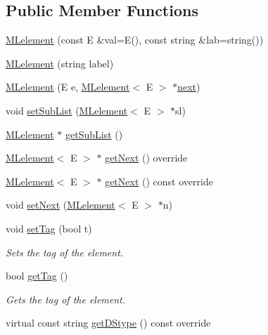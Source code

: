 \subsection*{Public Member Functions}
\begin{DoxyCompactItemize}
\item 
\hyperlink{classbridges_1_1datastructure_1_1_m_lelement_af73050e460a47d0b5d82ee6ae49b6c59}{M\+Lelement} (const E \&val=E(), const string \&lab=string())
\item 
\hyperlink{classbridges_1_1datastructure_1_1_m_lelement_aae22c04d644bcab2eba56bb8dc84d5eb}{M\+Lelement} (string label)
\item 
\hyperlink{classbridges_1_1datastructure_1_1_m_lelement_ac3349ecdbce79646839cdb9ea1e90b2f}{M\+Lelement} (E e, \hyperlink{classbridges_1_1datastructure_1_1_m_lelement}{M\+Lelement}$<$ E $>$ $\ast$\hyperlink{classbridges_1_1datastructure_1_1_s_lelement_afc016a593a4a5aba82021ee34edadbfc}{next})
\item 
void \hyperlink{classbridges_1_1datastructure_1_1_m_lelement_a5d6a2fa775c819c8c7609b539c93fe9f}{set\+Sub\+List} (\hyperlink{classbridges_1_1datastructure_1_1_m_lelement}{M\+Lelement}$<$ E $>$ $\ast$sl)
\item 
\hyperlink{classbridges_1_1datastructure_1_1_m_lelement}{M\+Lelement} $\ast$ \hyperlink{classbridges_1_1datastructure_1_1_m_lelement_a9faeb30ffd023746ce36e05705a62b2d}{get\+Sub\+List} ()
\item 
\hyperlink{classbridges_1_1datastructure_1_1_m_lelement}{M\+Lelement}$<$ E $>$ $\ast$ \hyperlink{classbridges_1_1datastructure_1_1_m_lelement_a47b417db0b948b6899eece572bef9274}{get\+Next} () override
\item 
\hyperlink{classbridges_1_1datastructure_1_1_m_lelement}{M\+Lelement}$<$ E $>$ $\ast$ \hyperlink{classbridges_1_1datastructure_1_1_m_lelement_a611b3e7d54fdfbc622004a50ca718e6e}{get\+Next} () const override
\item 
void \hyperlink{classbridges_1_1datastructure_1_1_m_lelement_a13dfba9b3fa1af26c6d344fa7a086429}{set\+Next} (\hyperlink{classbridges_1_1datastructure_1_1_m_lelement}{M\+Lelement}$<$ E $>$ $\ast$n)
\item 
void \hyperlink{classbridges_1_1datastructure_1_1_m_lelement_a32ba4ec57e6f5e1e65f82784a7f45804}{set\+Tag} (bool t)
\begin{DoxyCompactList}\small\item\em Sets the tag of the element. \end{DoxyCompactList}\item 
bool \hyperlink{classbridges_1_1datastructure_1_1_m_lelement_a44ef87048b6b0424478f498cf99149f2}{get\+Tag} ()
\begin{DoxyCompactList}\small\item\em Gets the tag of the element. \end{DoxyCompactList}\item 
virtual const string \hyperlink{classbridges_1_1datastructure_1_1_m_lelement_a735c3cb43648b4d4e7d3316cdc1a1952}{get\+D\+Stype} () const override
\end{DoxyCompactItemize}
